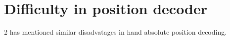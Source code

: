 \section{Difficulty in position decoder}
\begin{multicols}{2}
\cite{goodman2019postural} has mentioned similar disadvatages in hand absolute position decoding.
\end{multicols}